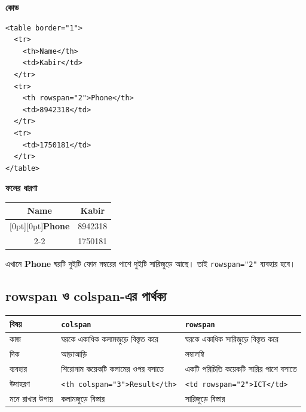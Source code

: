 \par\noindent
\begin{minipage}[t]{.50\linewidth}\vspace{0pt}\small
\textbf{\color{chFourTeal}কোড}\par
\begin{verbatim}
<table border="1">
  <tr>
    <th>Name</th>
    <td>Kabir</td>
  </tr>
  <tr>
    <th rowspan="2">Phone</th>
    <td>8942318</td>
  </tr>
  <tr>
    <td>1750181</td>
  </tr>
</table>
\end{verbatim}
\par\smallskip
\end{minipage}\hfill
\begin{minipage}[t]{.46\linewidth}\vspace{0pt}\small
\textbf{\color{chFourTeal}ফলের ধারণা}\par
\begin{center}
\begin{tabular}{|c|c|}
\hline
\textbf{Name} & Kabir \\
\hline
\raisebox{-.5\normalbaselineskip}[0pt][0pt]{\textbf{Phone}} & 8942318 \\
\cline{2-2}
 & 1750181 \\
\hline
\end{tabular}
\end{center}
এখানে \textbf{Phone} ঘরটি দুইটি ফোন নম্বরের পাশে দুইটি সারিজুড়ে আছে। তাই \texttt{rowspan="2"} ব্যবহার হবে।
\par\smallskip
\end{minipage}\par




\subsection{rowspan ও colspan-এর পার্থক্য}

\begin{center}
\footnotesize
\begin{tabular}{|p{}|p{}|p{}|}
\hline
\textbf{বিষয়} & \textbf{\texttt{colspan}} & \textbf{\texttt{rowspan}} \\
\hline
কাজ & ঘরকে একাধিক কলামজুড়ে বিস্তৃত করে & ঘরকে একাধিক সারিজুড়ে বিস্তৃত করে \\
\hline
দিক & আড়াআড়ি & লম্বালম্বি \\
\hline
ব্যবহার & শিরোনাম কয়েকটি কলামের ওপর বসাতে & একটি পরিচিতি কয়েকটি সারির পাশে বসাতে \\
\hline
উদাহরণ & \texttt{<th colspan="3">Result</th>} & \texttt{<td rowspan="2">ICT</td>} \\
\hline
মনে রাখার উপায় & কলামজুড়ে বিস্তার & সারিজুড়ে বিস্তার \\
\hline
\end{tabular}
\end{center}

